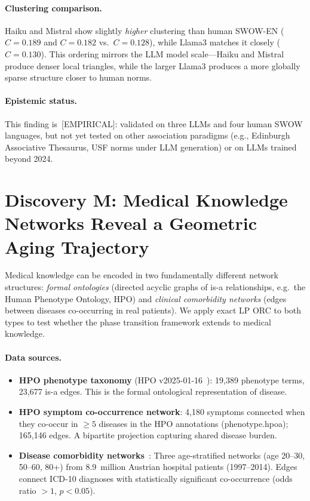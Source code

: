 \documentclass[11pt,a4paper]{article}
\begin{document}
\paragraph{Clustering comparison.}
Haiku and Mistral show slightly \emph{higher} clustering than human SWOW-EN
($C=0.189$ and $C=0.182$ vs.\ $C=0.128$), while Llama3 matches it closely
($C=0.130$). This ordering mirrors the LLM model scale---Haiku and Mistral
produce denser local triangles, while the larger Llama3 produces a more globally
sparse structure closer to human norms.

\paragraph{Epistemic status.}
This finding is~[EMPIRICAL]: validated on three LLMs and four human SWOW languages,
but not yet tested on other association paradigms (e.g., Edinburgh Associative Thesaurus,
USF norms under LLM generation) or on LLMs trained beyond 2024.

\section{Discovery M: Medical Knowledge Networks Reveal a Geometric Aging Trajectory}
\label{sec:discovery_m}

Medical knowledge can be encoded in two fundamentally different network structures:
\emph{formal ontologies} (directed acyclic graphs of is-a relationships, e.g.\ the
Human Phenotype Ontology, HPO) and \emph{clinical comorbidity networks} (edges between
diseases co-occurring in real patients). We apply exact LP ORC to both types to test
whether the phase transition framework extends to medical knowledge.

\paragraph{Data sources.}
\begin{itemize}
  \item \textbf{HPO phenotype taxonomy} (HPO v2025-01-16~\cite{hpo2021}):
    19,389 phenotype terms, 23,677 is-a edges.
    This is the formal ontological representation of disease.
  \item \textbf{HPO symptom co-occurrence network}: 4,180 symptoms connected when
    they co-occur in $\geq 5$ diseases in the HPO annotations (phenotype.hpoa);
    165,146 edges. A bipartite projection capturing shared disease burden.
  \item \textbf{Disease comorbidity networks}~\cite{ledebur2025comorbidity}:
    Three age-stratified networks (age 20--30, 50--60, 80+) from 8.9~million Austrian
    hospital patients (1997--2014). Edges connect ICD-10 diagnoses with statistically
    significant co-occurrence (odds ratio $>1$, $p<0.05$).
\end{itemize}
\end{document}
